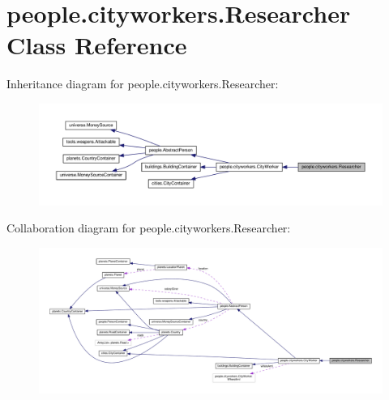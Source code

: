 \hypertarget{classpeople_1_1cityworkers_1_1_researcher}{}\section{people.\+cityworkers.\+Researcher Class Reference}
\label{classpeople_1_1cityworkers_1_1_researcher}


Inheritance diagram for people.\+cityworkers.\+Researcher\+:\nopagebreak
\begin{figure}[H]
\begin{center}
\leavevmode
\includegraphics[width=350pt]{classpeople_1_1cityworkers_1_1_researcher__inherit__graph}
\end{center}
\end{figure}


Collaboration diagram for people.\+cityworkers.\+Researcher\+:\nopagebreak
\begin{figure}[H]
\begin{center}
\leavevmode
\includegraphics[width=350pt]{classpeople_1_1cityworkers_1_1_researcher__coll__graph}
\end{center}
\end{figure}
